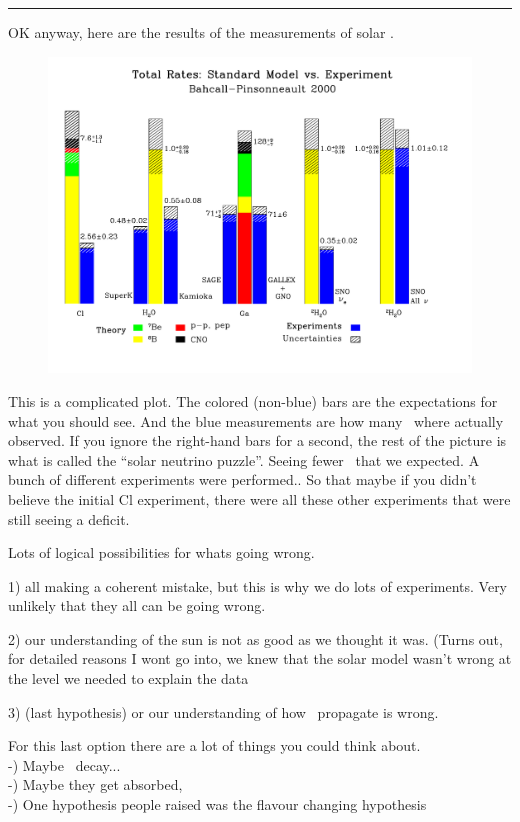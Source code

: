 {\noindent\rule{\textwidth}{1pt}

OK anyway, here are the results of the measurements of solar \nus.


\begin{figure}[h!]
\centering
\includegraphics[width=1.0\textwidth]{./SolarNuPuzzle.pdf}
\end{figure}


This is a complicated plot. 
The colored (non-blue) bars are the expectations for what you should see.
And the blue measurements are how many \nus\ where actually observed.  
If you ignore the right-hand bars for a second, the rest of the picture is what is called the ``solar neutrino puzzle''. 
Seeing fewer \nus\ that we expected. 
A bunch of different experiments were performed..  
So that maybe if you didn't believe the initial Cl experiment, there were all these other experiments that were still seeing a deficit. 

Lots of logical possibilities for whats going wrong. 

1) all making a coherent mistake, but this is why we do lots of experiments.  Very unlikely that they all can be going wrong. 

2) our understanding of the sun is not as good as we thought it was.
(Turns out, for detailed reasons I wont go into, we knew  that the solar model wasn't wrong at the level we needed to explain the data

3) (last hypothesis) or our understanding of how \nus\ propagate is wrong. 

For this last option there are a lot of things you could think about. \\
 -) Maybe \nus\ decay...\\
 -) Maybe they get absorbed, \\
 -) One hypothesis people raised was the flavour changing hypothesis\\

}
